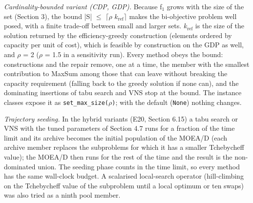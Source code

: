 \emph{Cardinality-bounded variant (CDP, GDP).} Because f$_{1}$ grows with the size of the set (Section 3), the bound |S| $\leq$ $\lceil$$\rho$ $k_{\mathrm{ref}}$$\rceil$ makes the bi-objective problem well posed, with a finite trade-off between small and larger sets. $k_{\mathrm{ref}}$ is the size of the solution returned by the efficiency-greedy construction (elements ordered by capacity per unit of cost), which is feasible by construction on the GDP as well, and $\rho$ = 2 ($\rho$ = 1.5 in a sensitivity run). Every method obeys the bound: constructions and the repair remove, one at a time, the member with the smallest contribution to MaxSum among those that can leave without breaking the capacity requirement (falling back to the greedy solution if none can), and the dominating insertions of tabu search and VNS stop at the bound. The instance classes expose it as \texttt{set\_\allowbreak{}max\_\allowbreak{}size($\rho$)}; with the default (\texttt{None}) nothing changes.

\emph{Trajectory seeding.} In the hybrid variants (E20, Section 6.15) a tabu search or VNS with the tuned parameters of Section 4.7 runs for a fraction of the time limit and its archive becomes the initial population of the MOEA/D (each archive member replaces the subproblems for which it has a smaller Tchebycheff value); the MOEA/D then runs for the rest of the time and the result is the non-dominated union. The seeding phase counts in the time limit, so every method has the same wall-clock budget. A scalarised local-search operator (hill-climbing on the Tchebycheff value of the subproblem until a local optimum or ten swaps) was also tried as a ninth pool member.
